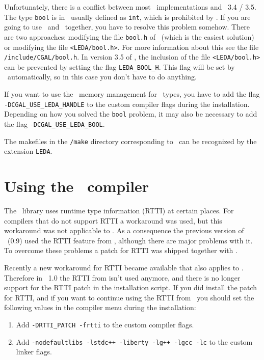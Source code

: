 Unfortunately, there is a conflict between most \stl\ implementations
and \leda\ 3.4 / 3.5.  The type \texttt{bool} is in \stl\ usually
defined as \texttt{int}, which is prohibited by \leda. If you are
going to use \leda\ and \cgal\ together, you have to resolve this
problem somehow.  There are two approaches: modifying the file
\texttt{bool.h} of \stl\ (which is the easiest solution) or modifying
the file {\tt <LEDA/bool.h>}.  For more information about this see the
file \texttt{\cgaldir/include/CGAL/bool.h}.  In version 3.5 of \leda,
the inclusion of the file {\tt <LEDA/bool.h>} can be prevented by
setting the flag {\tt LEDA\_BOOL\_H}. This flag will be set by \cgal\ 
automatically, so in this case you don't have to do anything.

If you want to use the \leda\ memory management for \cgal\ types, you
have to add the flag \texttt{-DCGAL\_USE\_LEDA\_HANDLE} to the custom
compiler flags during the installation. Depending on how you solved
the {\tt bool} problem, it may also be necessary to add the flag
\texttt{-DCGAL\_USE\_LEDA\_BOOL}.

The makefiles in the \texttt{\cgaldir/make} directory corresponding to
\leda\ can be recognized by the extension \texttt{LEDA}.

\section{Using the \ compiler \label{sec:gcc}}

The \cgal\ library uses runtime type information (RTTI) at certain
places.  For compilers that do not support RTTI a workaround was used,
but this workaround was not applicable to . As a consequence
the previous version of \cgal\ (0.9) used the RTTI feature from
, although there are major problems with it. To overcome these
problems a patch for  RTTI was shipped together with \cgal.

Recently a new workaround for RTTI became available that also applies
to . Therefore in \cgal\ 1.0 the RTTI from \gcc272 isn't used
anymore, and there is no longer support for the RTTI patch in the
installation script. If you did install the patch for RTTI, and if you
want to continue using the RTTI from \gcc272\ you should set the
following values in the compiler menu during the installation:

\begin{enumerate}
\item Add {\tt -DRTTI\_PATCH -frtti} to the custom compiler flags.
\item Add {\tt -nodefaultlibs -lstdc++ -liberty -lg++ -lgcc -lc} to
  the custom linker flags.
\end{enumerate}

